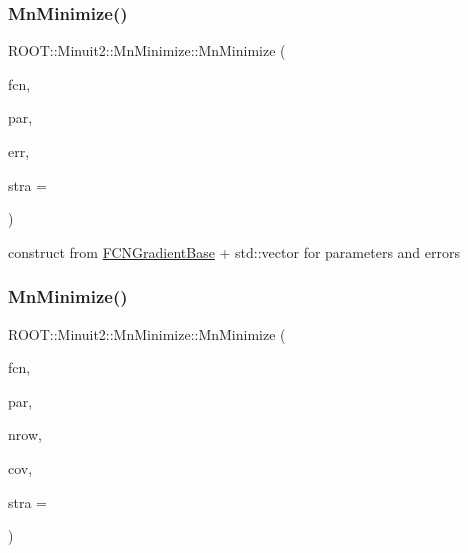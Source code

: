 \subsubsection{\texorpdfstring{MnMinimize()}{MnMinimize()}\hspace{0.1cm}{\footnotesize\ttfamily [7/26]}}
{\footnotesize\ttfamily R\+O\+O\+T\+::\+Minuit2\+::\+Mn\+Minimize\+::\+Mn\+Minimize (\begin{DoxyParamCaption}\item[{const \mbox{\hyperlink{classROOT_1_1Minuit2_1_1FCNGradientBase}{F\+C\+N\+Gradient\+Base}} \&}]{fcn,  }\item[{const std\+::vector$<$ double $>$ \&}]{par,  }\item[{const std\+::vector$<$ double $>$ \&}]{err,  }\item[{unsigned int}]{stra = {} }\end{DoxyParamCaption})\hspace{0.3cm}{\ttfamily [inline]}}



construct from \mbox{\hyperlink{classROOT_1_1Minuit2_1_1FCNGradientBase}{F\+C\+N\+Gradient\+Base}} + std\+::vector for parameters and errors 

\mbox{\label{classROOT_1_1Minuit2_1_1MnMinimize_ad3e1fd3c735a330f90f37e8e4ac3efce}} 
\subsubsection{\texorpdfstring{MnMinimize()}{MnMinimize()}\hspace{0.1cm}{\footnotesize\ttfamily [8/26]}}
{\footnotesize\ttfamily R\+O\+O\+T\+::\+Minuit2\+::\+Mn\+Minimize\+::\+Mn\+Minimize (\begin{DoxyParamCaption}\item[{const \mbox{\hyperlink{classROOT_1_1Minuit2_1_1FCNGradientBase}{F\+C\+N\+Gradient\+Base}} \&}]{fcn,  }\item[{const std\+::vector$<$ double $>$ \&}]{par,  }\item[{unsigned int}]{nrow,  }\item[{const std\+::vector$<$ double $>$ \&}]{cov,  }\item[{unsigned int}]{stra = {} }\end{DoxyParamCaption})\hspace{0.3cm}{\ttfamily [inline]}}



